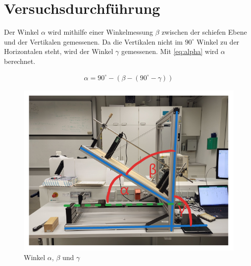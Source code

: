 \section{Versuchsdurchführung}

Der Winkel $\alpha$ wird mithilfe einer Winkelmessung $\beta$ zwischen der schiefen Ebene und der Vertikalen gemessenen. Da die Vertikalen nicht im $90^\circ$ Winkel zu der Horizontalen steht, wird der Winkel $\gamma$ gemessenen. Mit \autoref{eq:alpha} wird $\alpha$ berechnet.

\begin{align}
    \alpha = 90^\circ - (\beta - (90^\circ - \gamma))
    \label{eq:alpha}
\end{align}

\begin{figure}[ht]
    \center
    \includegraphics{images/Versuch-Winkel.pdf}
    \caption[Winkelmessung]{Winkel $\alpha$, $\beta$ und $\gamma$}
    \label{fig:Winkelmessung}
\end{figure}